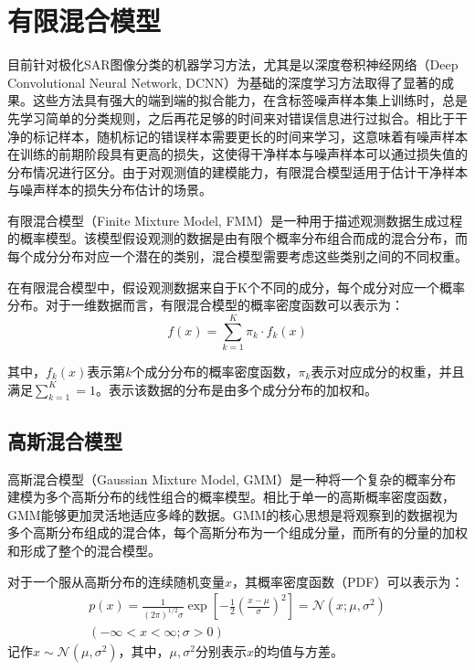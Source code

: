 \section{有限混合模型}
目前针对极化SAR图像分类的机器学习方法，尤其是以深度卷积神经网络（Deep Convolutional Neural Network, DCNN）为基础的深度学习方法取得了显著的成果。这些方法具有强大的端到端的拟合能力，在含标签噪声样本集上训练时，总是先学习简单的分类规则，之后再花足够的时间来对错误信息进行过拟合。相比于干净的标记样本，随机标记的错误样本需要更长的时间来学习，这意味着有噪声样本在训练的前期阶段具有更高的损失，这使得干净样本与噪声样本可以通过损失值的分布情况进行区分。由于对观测值的建模能力，有限混合模型适用于估计干净样本与噪声样本的损失分布估计的场景。

有限混合模型（Finite Mixture Model, FMM）是一种用于描述观测数据生成过程的概率模型。该模型假设观测的数据是由有限个概率分布组合而成的混合分布，而每个成分分布对应一个潜在的类别，混合模型需要考虑这些类别之间的不同权重。

在有限混合模型中，假设观测数据来自于K个不同的成分，每个成分对应一个概率分布。对于一维数据而言，有限混合模型的概率密度函数可以表示为：
\begin{equation}
    f(x)=\sum_{k=1}^{K}\pi_k \cdot f_k(x)
\end{equation}

其中，$f_k(x)$表示第$k$个成分分布的概率密度函数，$\pi_k$表示对应成分的权重，并且满足$\sum_{k=1}^{K}=1$。表示该数据的分布是由多个成分分布的加权和。

\subsection{高斯混合模型}
高斯混合模型（Gaussian Mixture Model, GMM）是一种将一个复杂的概率分布建模为多个高斯分布的线性组合的概率模型。相比于单一的高斯概率密度函数，GMM能够更加灵活地适应多峰的数据。GMM的核心思想是将观察到的数据视为多个高斯分布组成的混合体，每个高斯分布为一个组成分量，而所有的分量的加权和形成了整个的混合模型。

对于一个服从高斯分布的连续随机变量$x$，其概率密度函数（PDF）可以表示为：
\begin{equation}
    \begin{gathered}
        p\left( x \right) =\frac{1}{\left( 2\pi \right) ^{1/2}\sigma}\exp \left[ -\frac{1}{2}\left( \frac{x-\mu}{\sigma} \right) ^2 \right] =\mathcal{N} \left( x;\mu ,\sigma ^2 \right)
        \\
        \left( -\infty <x<\infty ;\sigma >0 \right)
    \end{gathered}
\end{equation}
记作$x \sim \mathcal{N}(\mu,\sigma^2)$，其中，$\mu,\sigma^2$分别表示$x$的均值与方差。

